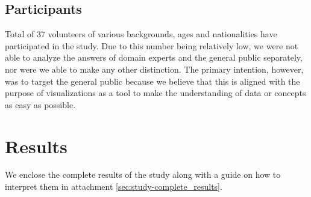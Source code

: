 \subsection{Participants}

Total of 37 volunteers of various backgrounds, ages and nationalities have participated in the study. Due to this number being relatively low, we were not able to analyze the answers of domain experts and the general public separately, nor were we able to make any other distinction. The primary intention, however, was to target the general public because we believe that this is aligned with the purpose of visualizations as a tool to make the understanding of data or concepts as easy as possible.

\section{Results}

We enclose the complete results of the study along with a guide on how to interpret them in attachment \ref{sec:study-complete_results}.